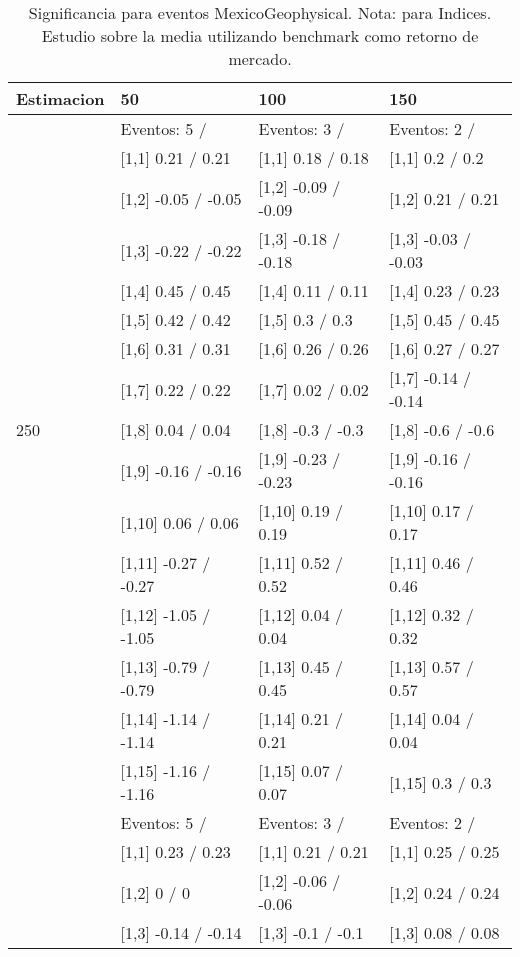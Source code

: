\begin{table}

\caption{Significancia para eventos MexicoGeophysical. Nota: para Indices. Estudio sobre la media utilizando benchmark como retorno de mercado.}
\centering
\begin{tabular}[t]{llll}
\toprule
Estimacion & 50 & 100 & 150\\
\midrule
 & Eventos:  5 / & Eventos:  3 / & Eventos:  2 /\\
 & {}[1,1] 0.21  / 0.21 & {}[1,1] 0.18  / 0.18 & {}[1,1] 0.2  / 0.2\\
 & {}[1,2] -0.05  / -0.05 & {}[1,2] -0.09  / -0.09 & {}[1,2] 0.21  / 0.21\\
 & {}[1,3] -0.22  / -0.22 & {}[1,3] -0.18  / -0.18 & {}[1,3] -0.03  / -0.03\\
 & {}[1,4] 0.45  / 0.45 & {}[1,4] 0.11  / 0.11 & {}[1,4] 0.23  / 0.23\\
\addlinespace
 & {}[1,5] 0.42  / 0.42 & {}[1,5] 0.3  / 0.3 & {}[1,5] 0.45  / 0.45\\
 & {}[1,6] 0.31  / 0.31 & {}[1,6] 0.26  / 0.26 & {}[1,6] 0.27  / 0.27\\
 & {}[1,7] 0.22  / 0.22 & {}[1,7] 0.02  / 0.02 & {}[1,7] -0.14  / -0.14\\
250 & {}[1,8] 0.04  / 0.04 & {}[1,8] -0.3  / -0.3 & {}[1,8] -0.6  / -0.6\\
 & {}[1,9] -0.16  / -0.16 & {}[1,9] -0.23  / -0.23 & {}[1,9] -0.16  / -0.16\\
\addlinespace
 & {}[1,10] 0.06  / 0.06 & {}[1,10] 0.19  / 0.19 & {}[1,10] 0.17  / 0.17\\
 & {}[1,11] -0.27  / -0.27 & {}[1,11] 0.52  / 0.52 & {}[1,11] 0.46  / 0.46\\
 & {}[1,12] -1.05  / -1.05 & {}[1,12] 0.04  / 0.04 & {}[1,12] 0.32  / 0.32\\
 & {}[1,13] -0.79  / -0.79 & {}[1,13] 0.45  / 0.45 & {}[1,13] 0.57  / 0.57\\
 & {}[1,14] -1.14  / -1.14 & {}[1,14] 0.21  / 0.21 & {}[1,14] 0.04  / 0.04\\
\addlinespace
 & {}[1,15] -1.16  / -1.16 & {}[1,15] 0.07  / 0.07 & {}[1,15] 0.3  / 0.3\\
 & Eventos:  5 / & Eventos:  3 / & Eventos:  2 /\\
 & {}[1,1] 0.23  / 0.23 & {}[1,1] 0.21  / 0.21 & {}[1,1] 0.25  / 0.25\\
 & {}[1,2] 0  / 0 & {}[1,2] -0.06  / -0.06 & {}[1,2] 0.24  / 0.24\\
 & {}[1,3] -0.14  / -0.14 & {}[1,3] -0.1  / -0.1 & {}[1,3] 0.08  / 0.08\\

\end{tabular}
\end{table}
